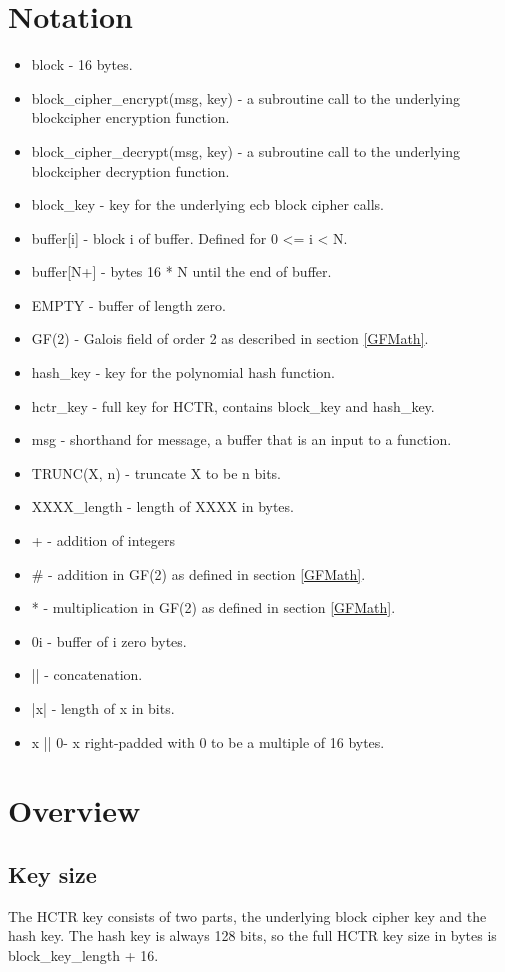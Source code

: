 \documentclass[i-d]{rfc}
\begin{document}
\section{Notation}
\begin{itemize}
    \item block - 16 bytes.
    \item block\_cipher\_encrypt(msg, key) - a subroutine call to the underlying blockcipher encryption function.
    \item block\_cipher\_decrypt(msg, key) - a subroutine call to the underlying blockcipher decryption function.
    \item block\_key - key for the underlying ecb block cipher calls.
    \item buffer[i] - block i of buffer.  Defined for 0 <= i < N.
    \item buffer[N+] - bytes 16 * N until the end of buffer. 
    \item EMPTY - buffer of length zero.
    \item GF(2) - Galois field of order 2 as described in section \ref{GFMath}.
    \item hash\_key - key for the polynomial hash function.
    \item hctr\_key - full key for HCTR, contains block\_key and hash\_key.
    \item msg - shorthand for message, a buffer that is an input to a function.
    \item TRUNC(X, n) - truncate X to be n bits. 
    \item XXXX\_length - length of XXXX in bytes.
    \item + - addition of integers
    \item \# - addition in GF(2) as defined in section \ref{GFMath}.
    \item * - multiplication in GF(2) as defined in section \ref{GFMath}.
    \item 0\pow i - buffer of i zero bytes.
    \item || - concatenation.
    \item |x| - length of x in bits.
    \item x || 0\pow * - x right-padded with 0 to be a multiple of 16 bytes.
\end{itemize}
\section{Overview}

\subsection{Key size}
The HCTR key consists of two parts, the underlying block cipher key and the hash key. The hash key is always 128 bits, so the full HCTR key size in bytes is block\_key\_length + 16.
\end{document}
